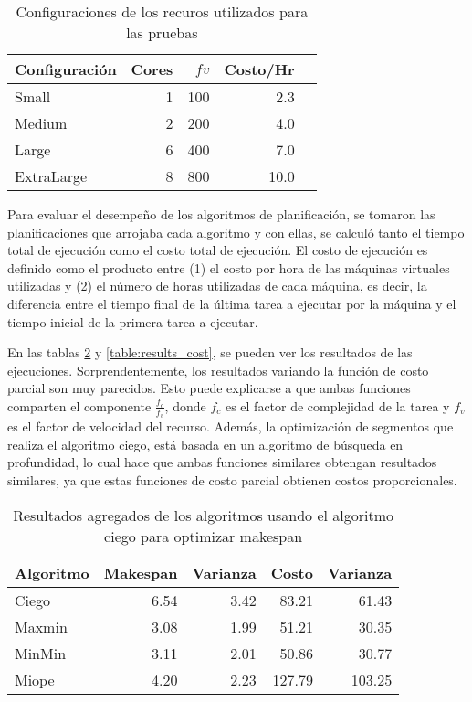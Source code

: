 \begin{table}[ht]
\centering
\begin{tabular}{lrrrr}
  \hline
Configuraci\'on & Cores & $fv$ & Costo/Hr \\ 
  \hline
  Small & 1 & 100 & 2.3 \\ 
  Medium & 2 & 200 & 4.0 \\ 
  Large & 6 & 400 & 7.0 \\ 
  ExtraLarge & 8 & 800 & 10.0 \\ 
   \hline
\end{tabular}
\caption{Configuraciones de los recuros utilizados para las pruebas} 
\label{table:resource_configurations}
\end{table}

Para evaluar el desempeño de los algoritmos de planificación, se tomaron las planificaciones que arrojaba cada algoritmo y con ellas, se calculó tanto el tiempo total de ejecuci\'on como el costo total de ejecución. El costo de ejecución es definido como el producto entre (1) el costo por hora de las máquinas virtuales utilizadas y (2) el número de horas utilizadas de cada máquina, es decir, la diferencia entre el tiempo final de la última tarea a ejecutar por la máquina y el tiempo inicial de la primera tarea a ejecutar.

En las tablas \ref{table:results_makespan} y \ref{table:results_cost}, se pueden ver los resultados de las ejecuciones. Sorprendentemente, los resultados variando la funci\'on de costo parcial son muy parecidos. Esto puede explicarse a que ambas funciones comparten el componente $\frac{f_c}{f_v}$, donde $f_c$ es el factor de complejidad de la tarea y $f_v$ es el factor de velocidad del recurso. Además, la optimización de segmentos que realiza el algoritmo ciego, está basada en un algoritmo de búsqueda en profundidad, lo cual hace que ambas funciones similares obtengan resultados similares, ya que estas funciones de costo parcial obtienen costos proporcionales.


\begin{table}[ht]
\centering
\begin{tabular}{lrrrr}
  \hline
Algoritmo & Makespan & Varianza & Costo & Varianza \\ 
  \hline
  Ciego & 6.54 & 3.42 & 83.21 & 61.43 \\ 
  Maxmin & 3.08 & 1.99 & 51.21 & 30.35 \\ 
  MinMin & 3.11 & 2.01 & 50.86 & 30.77 \\ 
  Miope & 4.20 & 2.23 & 127.79 & 103.25 \\ 
  \hline
\end{tabular}
\caption{Resultados agregados de los algoritmos usando el algoritmo ciego para optimizar makespan} 
\label{table:results_makespan}
\end{table}


